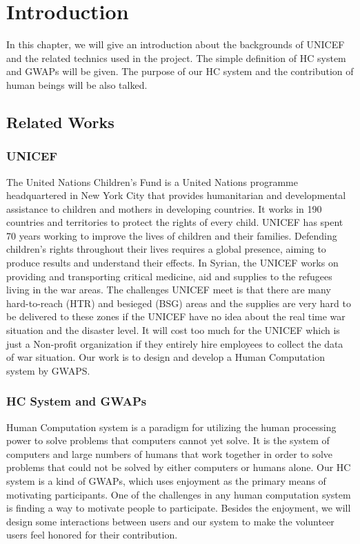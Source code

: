 \section{Introduction}

In this chapter, we will give an introduction about the backgrounds of UNICEF and the related technics 
used in the project. The simple definition of HC system and GWAPs will be given. 
The purpose of our HC system and the contribution of human beings will be also talked.

\subsection{Related Works}

\subsubsection{UNICEF}
The United Nations Children's Fund\cite{unicef1994state} is a United Nations programme headquartered
in New York City that provides humanitarian and developmental assistance to 
children and mothers in developing countries\cite{wiki:UNICEF}.
It works in 190 countries and territories to protect the rights of every child. 
UNICEF has spent 70 years working to improve the lives of children and their families. 
Defending children's rights throughout their lives requires a global presence, 
aiming to produce results and understand their effects. 
In Syrian, the UNICEF works on providing and transporting critical medicine, 
aid and supplies to the refugees living in the war areas. The challenges UNICEF meet is that 
there are many hard-to-reach (HTR) and besieged (BSG) areas and the supplies are 
very hard to be delivered to these zones if the UNICEF have no idea about 
the real time war situation and the disaster level. It will cost too much for the UNICEF 
which is just a Non-profit organization if they entirely hire employees to 
collect the data of war situation. 
Our work is to design and develop a Human Computation system by GWAPS\cite{lafourcade2015games}.

\subsubsection{HC System and GWAPs}
Human Computation system is a paradigm for utilizing the human processing power to solve problems that 
computers cannot yet solve\cite{quinn2011human}. 
It is the system of computers and large numbers of humans that work together in order to solve problems that 
could not be solved by either computers or humans alone\cite{quinn2009taxonomy}.
Our HC system is a kind of GWAPs, which uses enjoyment as the primary means of motivating participants. 
One of the challenges in any human computation system is finding a way to motivate people 
to participate\cite{quinn2011human}. 
Besides the enjoyment, we will design some interactions between users and our system to 
make the volunteer users feel honored for their contribution.

